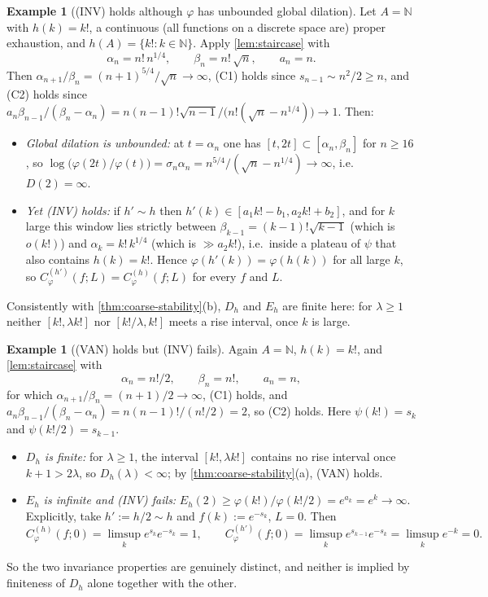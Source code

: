 \documentclass[11pt,a4paper]{article}
\numberwithin{equation}{section}
\theoremstyle{plain}
\theoremstyle{definition}
\newtheorem{example}[theorem]{Example}
\theoremstyle{remark}
\newcommand{\N}{\mathbb{N}}
\begin{document}
\begin{example}[(INV) holds although $\varphi$ has unbounded global dilation]
\label{ex:N-inv-strict}
Let $A=\N$ with $h(k)=k!$, a continuous (all functions on a discrete space are) proper
exhaustion, and $h(A)=\{k!:k\in\N\}$. Apply \cref{lem:staircase} with
\[
\alpha_n=n!\,n^{1/4},\qquad \beta_n=n!\,\sqrt n,\qquad a_n=n .
\]
Then $\alpha_{n+1}/\beta_n=(n+1)^{5/4}/\sqrt n\to\infty$, (C1) holds since
$s_{n-1}\sim n^{2}/2\ge n$, and (C2) holds since
$a_n\beta_{n-1}/(\beta_n-\alpha_n)=n(n-1)!\sqrt{n-1}/\bigl(n!(\sqrt n-n^{1/4})\bigr)\to1$.
Then:
\begin{itemize}
\item \emph{Global dilation is unbounded:} at $t=\alpha_n$ one has $[t,2t]\subset
[\alpha_n,\beta_n]$ for $n\ge16$, so
$\log\bigl(\varphi(2t)/\varphi(t)\bigr)=\sigma_n\alpha_n=n^{5/4}/(\sqrt n-n^{1/4})\to\infty$,
i.e.\ $D(2)=\infty$.
\item \emph{Yet \textup{(INV)} holds:} if $h'\sim h$ then $h'(k)\in[a_1k!-b_1,a_2k!+b_2]$,
and for $k$ large this window lies strictly between $\beta_{k-1}=(k-1)!\sqrt{k-1}$
(which is $o(k!)$) and $\alpha_k=k!\,k^{1/4}$ (which is $\gg a_2k!$), i.e.\ inside a
plateau of $\psi$ that also contains $h(k)=k!$. Hence $\varphi(h'(k))=\varphi(h(k))$ for
all large $k$, so $C^{(h')}_\varphi(f;L)=C^{(h)}_\varphi(f;L)$ for every $f$ and $L$.
\end{itemize}
Consistently with \cref{thm:coarse-stability}(b), $D_h$ and $E_h$ are finite here: for
$\lambda\ge1$ neither $[k!,\lambda k!]$ nor $[k!/\lambda,k!]$ meets a rise interval, once
$k$ is large.
\end{example}

\begin{example}[(VAN) holds but (INV) fails]\label{ex:N-van-strict}
Again $A=\N$, $h(k)=k!$, and \cref{lem:staircase} with
\[
\alpha_n=n!/2,\qquad \beta_n=n!,\qquad a_n=n,
\]
for which $\alpha_{n+1}/\beta_n=(n+1)/2\to\infty$, (C1) holds, and
$a_n\beta_{n-1}/(\beta_n-\alpha_n)=n(n-1)!/(n!/2)=2$, so (C2) holds. Here
$\psi(k!)=s_k$ and $\psi(k!/2)=s_{k-1}$.
\begin{itemize}
\item \emph{$D_h$ is finite:} for $\lambda\ge1$, the interval $[k!,\lambda k!]$ contains no
rise interval once $k+1>2\lambda$, so $D_h(\lambda)<\infty$; by
\cref{thm:coarse-stability}(a), \textup{(VAN)} holds.
\item \emph{$E_h$ is infinite and \textup{(INV)} fails:}
$E_h(2)\ge\varphi(k!)/\varphi(k!/2)=e^{a_k}=e^{k}\to\infty$. Explicitly, take
$h':=h/2\sim h$ and $f(k):=e^{-s_k}$, $L=0$. Then
\[
C^{(h)}_\varphi(f;0)=\limsup_k e^{s_k}e^{-s_k}=1,
\qquad
C^{(h')}_\varphi(f;0)=\limsup_k e^{s_{k-1}}e^{-s_k}=\limsup_k e^{-k}=0 .
\]
\end{itemize}
So the two invariance properties are genuinely distinct, and neither is implied by
finiteness of $D_h$ alone together with the other.
\end{example}
\end{document}
